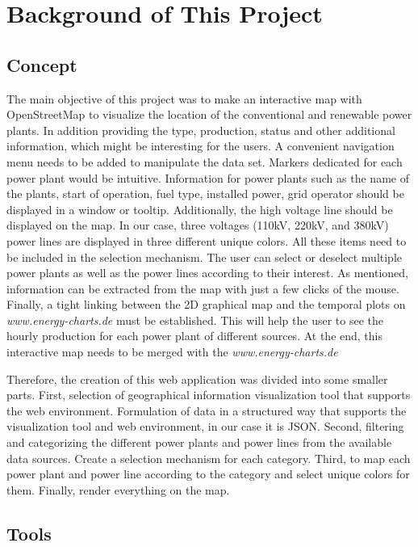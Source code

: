 \chapter{Background of This Project}
\label{chap:background}

\section{Concept}

The main objective of this project was to make an interactive map with OpenStreetMap to visualize the location of the conventional and renewable power plants. In addition providing the type, production, status and other additional information, which might be interesting for the users. A convenient navigation menu needs to be added to manipulate the data set. Markers dedicated for each power plant would be intuitive. Information for power plants such as the name of the plants, start of operation, fuel type, installed power, grid operator should be displayed in a window or tooltip. Additionally, the high voltage line should be displayed on the map. In our case, three voltages (110kV, 220kV, and 380kV) power lines are displayed in three different unique colors. All these items need to be included in the selection mechanism. The user can select or deselect multiple power plants as well as the power lines according to their interest. As mentioned, information can be extracted from the map with just a few clicks of the mouse. Finally, a tight linking between the 2D graphical map and the temporal plots on \textit{www.energy-charts.de} must be established. This will help the user to see the hourly production for each power plant of different sources. At the end, this interactive map needs to be merged with the \textit{www.energy-charts.de}

Therefore, the creation of this web application was divided into some smaller parts. First, selection of geographical information visualization tool that supports the web environment. Formulation of data in a structured way that supports the visualization tool and web environment, in our case it is JSON. Second, filtering and categorizing the different power plants and power lines from the available data sources. Create a selection mechanism for each category. Third, to map each power plant and power line according to the category and select unique colors for them. Finally, render everything on the map.   
\clearpage  

\section{Tools}

